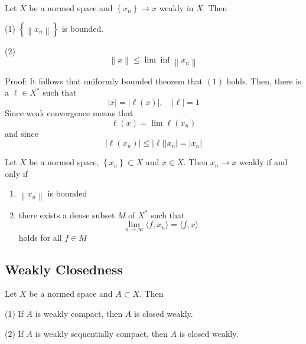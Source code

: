 \documentclass[12pt, oneside]{book}
\begin{document}
\begin{theorem}
    Let $X$ be a normed space and $\left\{x_n\right\} \to x$ weakly in $X$.
    Then

    (1) $\left\{\left\|x_n\right\|\right\}$ is bounded.

    (2)
    \begin{equation*}
        \left\|x\right\|
        \leq
        \lim\inf \left\|x_n\right\|
    \end{equation*}

    Proof:
    It follows that uniformly bounded theorem that $(1)$ holds.
    Then, there is a $\ell \in X^*$ such that
    \begin{equation*}
        |x|=|\ell(x)|, \quad|\ell|=1
    \end{equation*}
    Since weak convergence means that
    \begin{equation*}
        \ell(x)=\lim \ell\left(x_n\right)
    \end{equation*}
    and since
    \begin{equation*}
        \left|\ell\left(x_n\right)\right| \leq|\ell|\left|x_n\right|=\left|x_n\right|
    \end{equation*}
\end{theorem}

\begin{theorem}
    Let $X$ be a normed space, $\left\{x_n\right\} \subset X$ and $x \in X$. Then $x_n \to x$ weakly if and only if
    \begin{enumerate}
        \item $\left\|x_n\right\|$ is bounded
        \item there exists a dense subset $M$ of $X^*$ such that
              \begin{equation*}
                  \lim_{n \to \infty} \langle f , x_n\rangle
                  =
                  \langle f , x\rangle
              \end{equation*}
              holds for all $f \in M$
    \end{enumerate}

\end{theorem}

\subsection{Weakly Closedness}

\begin{proposition}
    Let $X$ be a normed space and $A\subset X$. Then

    (1) If $A$ is weakly compact, then $A$ is closed weakly.


    (2) If $A$ is weakly sequentially compact, then $A$ is closed weakly.
\end{proposition}
\end{document}
